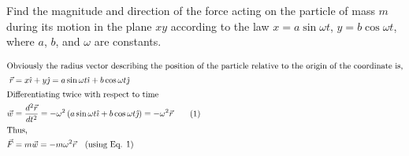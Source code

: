 \item Find the magnitude and direction of the force acting on the particle of mass \( m \) during its motion in the plane \( xy \) according to the law \( x = a \sin \omega t \), \( y = b \cos \omega t \), where \( a \), \( b \), and \( \omega \) are constants.\begin{solution}
    \begin{center}
    \end{center}
    
    \begin{align*}
        \intertext{Obviously the radius vector describing the position of the particle relative to the origin of the coordinate is,}
        \vec{r} &= x\hat{\imath} + y\hat{\jmath} = a \sin \omega t \hat{\imath} + b \cos \omega t \hat{\jmath}\\
        \intertext{Differentiating twice with respect to time}
        \vec{w} &= \dfrac{d^2 \vec{r}}{dt^2} = -\omega^2 \left( a \sin \omega t \hat{\imath} + b \cos \omega t \hat{\jmath} \right) = -\omega^2 \vec{r} \tag{1}\\
        \intertext{Thus,}
        \vec{F} &= m \vec{w} = - m \omega^2 \vec{r} \quad \text{(using Eq. 1)}
    \end{align*}
\end{solution}